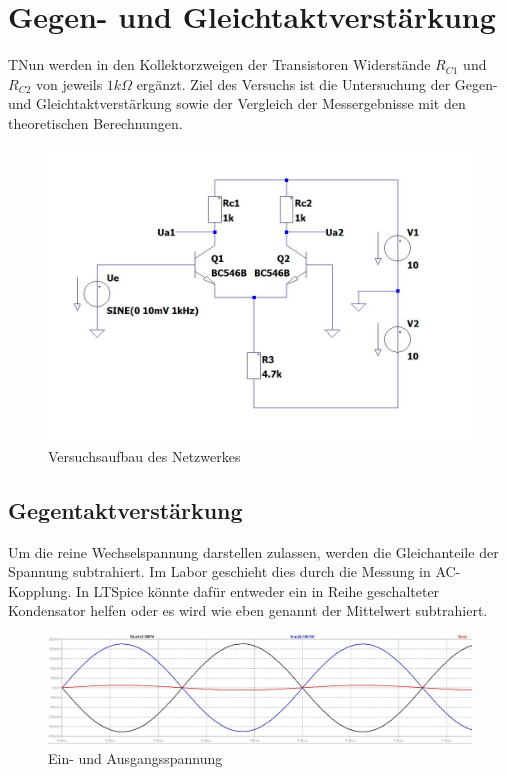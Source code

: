\documentclass{article}
\begin{document}
\section{Gegen- und Gleichtaktverstärkung}

\begin{task}
TNun werden in den Kollektorzweigen der Transistoren Widerstände $R_{C1}$ und $R_{C2}$ von jeweils $1k\Omega$ ergänzt. Ziel des Versuchs ist die Untersuchung der Gegen- und Gleichtaktverstärkung sowie der Vergleich der Messergebnisse mit den theoretischen Berechnungen.
\end{task}

\begin{figure}[h]
  \begin{center}
    \includegraphics[scale=0.4] {../assets/images/EL2P1/Aufbau 3.1.JPG}
    \caption{Versuchsaufbau des Netzwerkes}
  \end{center}
\end{figure}



\subsection{Gegentaktverstärkung}
Um die reine Wechselspannung darstellen zulassen, werden die Gleichanteile der Spannung subtrahiert.
Im Labor geschieht dies durch die Messung in AC-Kopplung. In LTSpice könnte dafür entweder ein in Reihe geschalteter Kondensator helfen
oder es wird wie eben genannt der Mittelwert subtrahiert.

\begin{figure}[h]
  \begin{center}
    \includegraphics[scale=0.35]{../assets/images/EL2P1/Messung 3.1 Ausgang.JPG}
    \caption{Ein- und Ausgangsspannung}
  \end{center}
\end{figure}
\newpage
\end{document}
